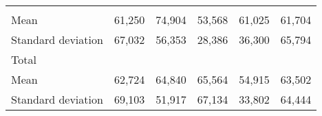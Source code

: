 \begin{tabular}{llllll}
  \multicolumn{1}{|r}{} &
  \multicolumn{1}{r}{} &
  \multicolumn{1}{r}{} &
  \multicolumn{1}{r}{} &
  \multicolumn{1}{r}{} \\
\multicolumn{1}{l}{\hspace{4em}Mean} &
  \multicolumn{1}{|r}{61,250} &
  \multicolumn{1}{r}{74,904} &
  \multicolumn{1}{r}{53,568} &
  \multicolumn{1}{r}{61,025} &
  \multicolumn{1}{r}{61,704} \\
\multicolumn{1}{l}{\hspace{4em}Standard deviation} &
  \multicolumn{1}{|r}{67,032} &
  \multicolumn{1}{r}{56,353} &
  \multicolumn{1}{r}{28,386} &
  \multicolumn{1}{r}{36,300} &
  \multicolumn{1}{r}{65,794} \\
\multicolumn{1}{l}{\hspace{3em}Total} &
  \multicolumn{1}{|r}{} &
  \multicolumn{1}{r}{} &
  \multicolumn{1}{r}{} &
  \multicolumn{1}{r}{} &
  \multicolumn{1}{r}{} \\
\multicolumn{1}{l}{\hspace{4em}Mean} &
  \multicolumn{1}{|r}{62,724} &
  \multicolumn{1}{r}{64,840} &
  \multicolumn{1}{r}{65,564} &
  \multicolumn{1}{r}{54,915} &
  \multicolumn{1}{r}{63,502} \\
\multicolumn{1}{l}{\hspace{4em}Standard deviation} &
  \multicolumn{1}{|r}{69,103} &
  \multicolumn{1}{r}{51,917} &
  \multicolumn{1}{r}{67,134} &
  \multicolumn{1}{r}{33,802} &
  \multicolumn{1}{r}{64,444} \\
\cline{1-6}
\end{tabular}

